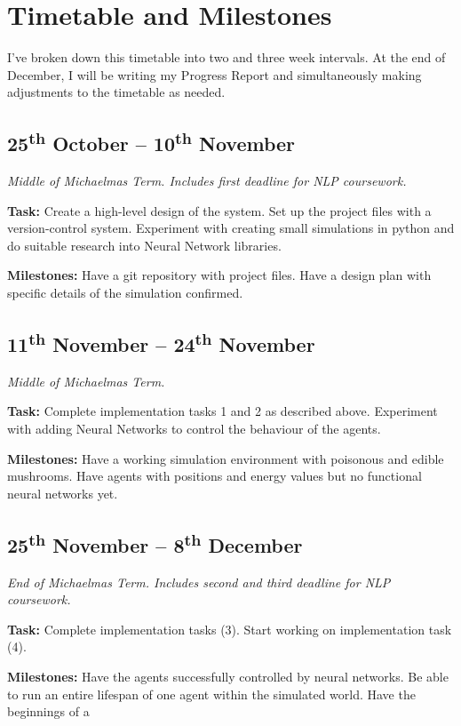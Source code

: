 \documentclass[12pt]{article}
\newcommand{\sups}{\textsuperscript}
\begin{document}
\section*{Timetable and Milestones}

I've broken down this timetable into two and three week intervals. At the end of December, I will be writing my Progress Report and simultaneously making adjustments to the timetable as needed.

\subsection*{25\sups{th} October -- 10\sups{th} November}

\emph{Middle of Michaelmas Term. Includes first deadline for NLP coursework.}


{\bf Task:} Create a high-level design of the system. Set up the project files with a version-control system. Experiment with creating small simulations in python and do suitable research into Neural Network libraries.

{\bf Milestones:} Have a git repository with project files. Have a design plan with specific details of the simulation confirmed.

\subsection*{11\sups{th} November -- 24\sups{th} November}

\emph{Middle of Michaelmas Term.}


{\bf Task:} Complete implementation tasks 1 and 2 as described above. Experiment with adding Neural Networks to control the behaviour of the agents.

{\bf Milestones:} Have a working simulation environment with poisonous and edible mushrooms. Have agents with positions and energy values but no functional neural networks yet.

\subsection*{25\sups{th} November -- 8\sups{th} December}

\emph{End of Michaelmas Term. Includes second and third deadline for NLP coursework.}


{\bf Task:} Complete implementation tasks (3). Start working on implementation task (4).

{\bf Milestones:} Have the agents successfully controlled by neural networks. Be able to run an entire lifespan of one agent within the simulated world. Have the beginnings of a 
\end{document}
